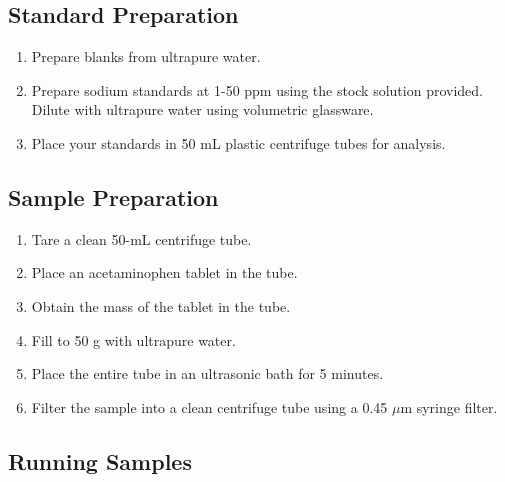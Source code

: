 \documentclass[]{tufte-book}
\providecommand{\tightlist}{%
  \setlength{\itemsep}{0pt}\setlength{\parskip}{0pt}}
\begin{document}
\hypertarget{standard-preparation-3}{%
\subsection{Standard Preparation}\label{standard-preparation-3}}

\begin{enumerate}
\def\labelenumi{\arabic{enumi}.}
\tightlist
\item
  Prepare blanks from ultrapure water.
\item
  Prepare sodium standards at 1-50 ppm using the stock solution provided. Dilute with ultrapure water using volumetric glassware.
\item
  Place your standards in 50 mL plastic centrifuge tubes for analysis.
\end{enumerate}

\hypertarget{sample-preparation-5}{%
\subsection{Sample Preparation}\label{sample-preparation-5}}

\begin{enumerate}
\def\labelenumi{\arabic{enumi}.}
\tightlist
\item
  Tare a clean 50-mL centrifuge tube.
\item
  Place an acetaminophen tablet in the tube.
\item
  Obtain the mass of the tablet in the tube.
\item
  Fill to 50 g with ultrapure water.
\item
  Place the entire tube in an ultrasonic bath for 5 minutes.
\item
  Filter the sample into a clean centrifuge tube using a 0.45 \(\mu\)m syringe filter.
\end{enumerate}

\hypertarget{running-samples-3}{%
\subsection{Running Samples}\label{running-samples-3}}
\end{document}
